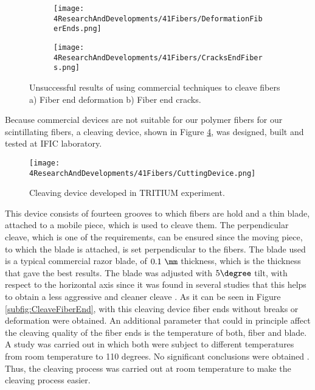 \begin{figure}
\centering
    \begin{subfigure}[b]{0.5\textwidth}
    \centering
    \texttt{[image: 4ResearchAndDevelopments/41Fibers/DeformationFiberEnds.png]}  
    \caption{\label{subfig:FiberEndDeformation}}
    \end{subfigure}
    \hfill
    \begin{subfigure}[b]{0.45\textwidth}
    \centering
    \texttt{[image: 4ResearchAndDevelopments/41Fibers/CracksEndFibers.png]}  
    \caption{\label{subfig:FiberEndCracks}}
    \end{subfigure}
 \caption{Unsuccessful results of using commercial techniques to cleave fibers a) Fiber end deformation b) Fiber end cracks.}
 \label{fig:BadCleavesOfFibers}
\end{figure}

Because commercial devices are not suitable for our polymer fibers for our scintillating fibers, a cleaving device, shown in Figure \ref{fig:CleaveTRITIUMDevice}, was designed, built and tested at IFIC laboratory.

\begin{figure}[hbtp]
\centering
\texttt{[image: 4ResearchAndDevelopments/41Fibers/CuttingDevice.png]}
\caption{Cleaving device developed in TRITIUM experiment. \label{fig:CleaveTRITIUMDevice}}
\end{figure}

This device consists of fourteen grooves to which fibers are hold and a thin blade, attached to a mobile piece, which is used to cleave them. The perpendicular cleave, which is one of the requirements, can be ensured since the moving piece, to which the blade is attached, is set perpendicular to the fibers. The blade used is a typical commercial razor blade, of $0.1~\mm$ thickness, which is the thickness that gave the best results. The blade was adjusted with $5\degree$ tilt, with respect to the horizontal axis since it was found in several studies that this helps to obtain a less aggressive and cleaner cleave \cite{AngleBlade, TemperatureBlade}. As it can be seen in Figure \ref{subfig:CleaveFiberEnd}, with this cleaving device fiber ends without breaks or deformation were obtained. An additional parameter that could in principle affect the cleaving quality of the fiber ends is the temperature of both, fiber and blade. A study was carried out in which both were subject to different temperatures from room temperature to 110 degrees. No significant conclusions were obtained \cite{TFGAlberto}. Thus, the cleaving process was carried out at room temperature to make the cleaving process easier.

